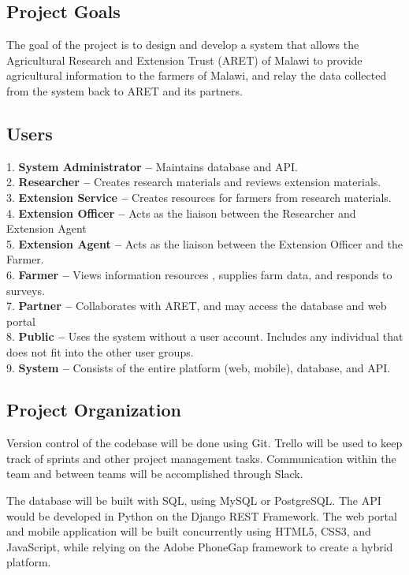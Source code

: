 \documentclass[12pt,letterpaper]{article}
\begin{document}
\subsection{Project Goals}

The goal of the project is to design and develop a system that allows the Agricultural Research and Extension Trust (ARET) of Malawi to provide agricultural information to the farmers of Malawi, and relay the data collected from the system back to ARET and its partners.

\subsection{Users}
1.\hspace*{5pt} \textbf{System Administrator -- } Maintains database and API.\\
2.\hspace*{5pt} \textbf{Researcher -- } Creates research materials and reviews extension materials. \\
3.\hspace*{5pt} \textbf{Extension Service --} Creates resources for farmers from research materials. \\
4.\hspace*{5pt} \textbf{Extension Officer -- } Acts as the liaison between the Researcher and Extension Agent \\
5.\hspace*{5pt} \textbf{Extension Agent -- } Acts as the liaison between the Extension Officer and the Farmer. \\
6.\hspace*{5pt} \textbf{Farmer -- } Views information resources , supplies farm data, and responds to surveys. \\
7.\hspace*{5pt} \textbf{Partner -- } Collaborates with ARET, and may access the database and web portal \\
8.\hspace*{5pt} \textbf{Public -- } Uses the system without a user account. Includes any individual that does not fit into the other user groups. \\
9.\hspace*{5pt} \textbf{System -- } Consists of the entire platform (web, mobile), database, and API.

\subsection{Project Organization}
Version control of the codebase will be done using Git. Trello will be used to keep track of sprints and other project management tasks. Communication within the team and between teams will be accomplished through Slack.\par
The database will be built with SQL, using MySQL or PostgreSQL. The API would be developed in Python on the Django REST Framework. The web portal and mobile application will be built concurrently using HTML5, CSS3, and JavaScript, while relying on the Adobe PhoneGap framework to create a hybrid platform.
\end{document}
